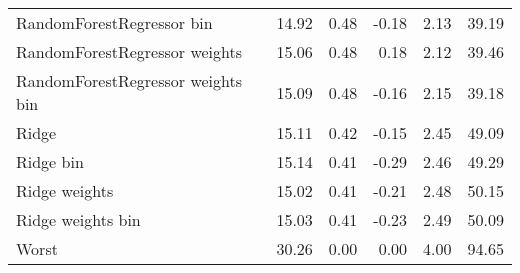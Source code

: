 \documentclass[]{article}
\begin{document}
\begin{table}
{\begin{tabular}{lrrrrr}
RandomForestRegressor bin         &     14.92 &  0.48 &  -0.18 & 2.13 &       39.19 \\
RandomForestRegressor weights     &     15.06 &  0.48 &   0.18 & 2.12 &       39.46 \\
RandomForestRegressor weights bin &     15.09 &  0.48 &  -0.16 & 2.15 &       39.18 \\
Ridge                             &     15.11 &  0.42 &  -0.15 & 2.45 &       49.09 \\
Ridge bin                         &     15.14 &  0.41 &  -0.29 & 2.46 &       49.29 \\
Ridge weights                     &     15.02 &  0.41 &  -0.21 & 2.48 &       50.15 \\
Ridge weights bin                 &     15.03 &  0.41 &  -0.23 & 2.49 &       50.09 \\
Worst                             &     30.26 &  0.00 &   0.00 & 4.00 &       94.65 \\
\bottomrule
\end{tabular}
 }
\end{table}
\end{document}
